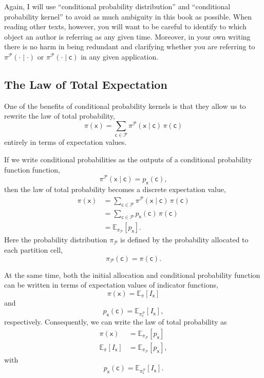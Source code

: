 \documentclass[
  letterpaper,
  DIV=11,
  numbers=noendperiod]{scrartcl}
\begin{document}
Again, I will use ``conditional probability distribution'' and
``conditional probability kernel'' to avoid as much ambiguity in this
book as possible. When reading other texts, however, you will want to be
careful to identify to which object an author is referring as any given
time. Moreover, in your own writing there is no harm in being redundant
and clarifying whether you are referring to
\(\pi^{\mathcal{P}}( \cdot \mid \cdot )\) or
\(\pi^{\mathcal{P}}( \cdot \mid \mathsf{c} )\) in any given application.

\subsection{The Law of Total
Expectation}\label{the-law-of-total-expectation}

One of the benefits of conditional probability kernels is that they
allow us to rewrite the law of total probability, \[
\pi( \mathsf{x} )
=
\sum_{ \mathsf{c} \in \mathcal{P} }
\pi^{\mathcal{P}}( \mathsf{x} \mid \mathsf{c} ) \,
\pi( \mathsf{c} )
\] entirely in terms of expectation values.

If we write conditional probabilities as the outputs of a conditional
probability function function, \[
\pi^{\mathcal{P}}( \mathsf{x} \mid \mathsf{c} )
=
p_{\mathsf{x}}( \mathsf{c} ),
\] then the law of total probability becomes a discrete expectation
value, \begin{align*}
\pi( \mathsf{x} )
&=
\sum_{ \mathsf{c} \in \mathcal{P} }
\pi^{\mathcal{P}}( \mathsf{x} \mid \mathsf{c} ) \, \pi( \mathsf{c} )
\\
&=
\sum_{ \mathsf{c} \in \mathcal{P} }
p_{\mathsf{x}}( \mathsf{c} ) \, \pi( \mathsf{c} )
\\
&=
\mathbb{E}_{ \pi_{\mathcal{P}} } [ p_{\mathsf{x}} ].
\end{align*} Here the probability distribution \(\pi_{\mathcal{P}}\) is
defined by the probability allocated to each partition cell, \[
\pi_{\mathcal{P}}( \mathsf{c} ) = \pi( \mathsf{c} ).
\]

At the same time, both the initial allocation and conditional
probability function can be written in terms of expectation values of
indicator functions, \[
\pi( \mathsf{x} )
=
\mathbb{E}_{\pi}[ I_{\mathsf{x}} ]
\] and \[
p_{\mathsf{x}}(\mathsf{c})
=
\mathbb{E}_{\pi^{\mathcal{P}}_{\mathsf{c}} }[ I_{\mathsf{x}} ],
\] respectively. Consequently, we can write the law of total probability
as \begin{align*}
\pi( \mathsf{x} )
&=
\mathbb{E}_{ \pi_{\mathcal{P}} } [ p_{\mathsf{x}} ]
\\
\mathbb{E}_{\pi}[ I_{\mathsf{x}} ]
&=
\mathbb{E}_{ \pi_{\mathcal{P}} } [ p_{\mathsf{x}} ],
\end{align*} with \[
p_{\mathsf{x}}(\mathsf{c})
=
\mathbb{E}_{\pi^{\mathcal{P}}_{\mathsf{c}} }[ I_{\mathsf{x}} ].
\]
\end{document}
